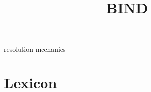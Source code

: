 \documentclass[a4paper,openany]{book}
\title{BIND}
\date{}
\begin{document}
\frontpage%
  {resolution mechanics}%

\glsunsetall



\chapter{Lexicon}

\printglossary[
  style=mcolindexspannav,
  ]

\printglossary[
  type=\acronymtype,
  ]

\pagebreak





\mainmatter

\glsresetall













\startappendix


\end{document}
